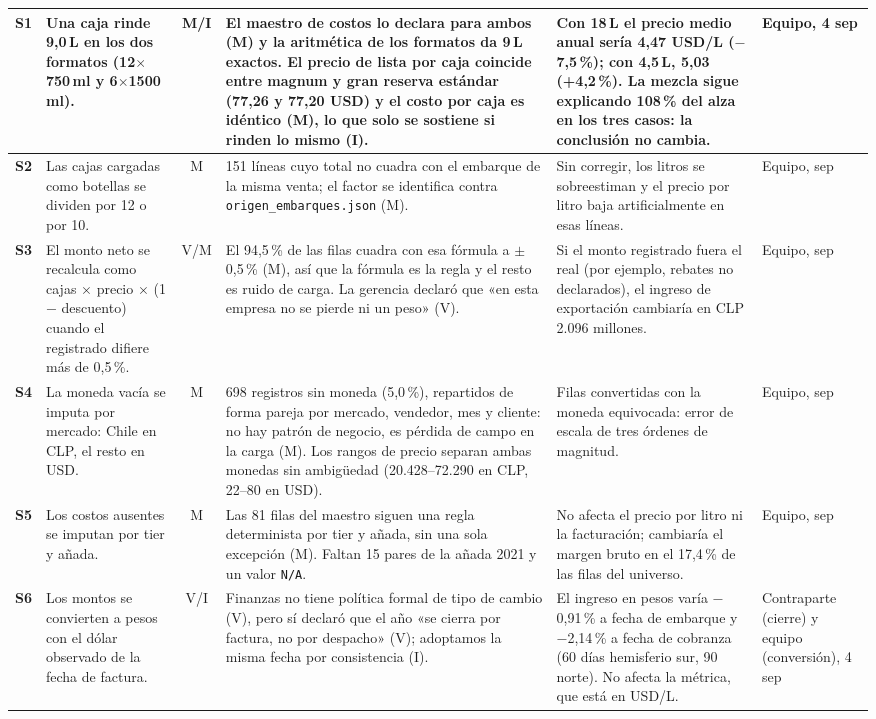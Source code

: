 \begin{longtable}{p{0.6cm} p{3.0cm} c p{4.3cm} p{4.3cm} p{2.0cm}}
\textbf{S1} & Una caja rinde 9,0\,L en los dos formatos (12$\times$750\,ml y 6$\times$1500\,ml). & M/I & El maestro de costos lo declara para ambos (M) y la aritmética de los formatos da 9\,L exactos. El precio de lista por caja coincide entre magnum y gran reserva estándar (77,26 y 77,20 USD) y el costo por caja es idéntico (M), lo que solo se sostiene si rinden lo mismo (I). & Con 18\,L el precio medio anual sería 4,47 USD/L ($-$7,5\,\%); con 4,5\,L, 5,03 (+4,2\,\%). La mezcla sigue explicando 108\,\% del alza en los tres casos: la conclusión no cambia. & Equipo, 4 sep \\
\midrule
\textbf{S2} & Las cajas cargadas como botellas se dividen por 12 o por 10. & M & 151 líneas cuyo total no cuadra con el embarque de la misma venta; el factor se identifica contra \texttt{origen\_embarques.json} (M). & Sin corregir, los litros se sobreestiman y el precio por litro baja artificialmente en esas líneas. & Equipo, sep \\
\midrule
\textbf{S3} & El monto neto se recalcula como cajas $\times$ precio $\times$ (1 $-$ descuento) cuando el registrado difiere más de 0,5\,\%. & V/M & El 94,5\,\% de las filas cuadra con esa fórmula a $\pm$0,5\,\% (M), así que la fórmula es la regla y el resto es ruido de carga. La gerencia declaró que «en esta empresa no se pierde ni un peso» (V). & Si el monto registrado fuera el real (por ejemplo, rebates no declarados), el ingreso de exportación cambiaría en CLP 2.096 millones. & Equipo, sep \\
\midrule
\textbf{S4} & La moneda vacía se imputa por mercado: Chile en CLP, el resto en USD. & M & 698 registros sin moneda (5,0\,\%), repartidos de forma pareja por mercado, vendedor, mes y cliente: no hay patrón de negocio, es pérdida de campo en la carga (M). Los rangos de precio separan ambas monedas sin ambigüedad (20.428--72.290 en CLP, 22--80 en USD). & Filas convertidas con la moneda equivocada: error de escala de tres órdenes de magnitud. & Equipo, sep \\
\midrule
\textbf{S5} & Los costos ausentes se imputan por tier y añada. & M & Las 81 filas del maestro siguen una regla determinista por tier y añada, sin una sola excepción (M). Faltan 15 pares de la añada 2021 y un valor \texttt{N/A}. & No afecta el precio por litro ni la facturación; cambiaría el margen bruto en el 17,4\,\% de las filas del universo. & Equipo, sep \\
\midrule
\textbf{S6} & Los montos se convierten a pesos con el dólar observado de la fecha de factura. & V/I & Finanzas no tiene política formal de tipo de cambio (V), pero sí declaró que el año «se cierra por factura, no por despacho» (V); adoptamos la misma fecha por consistencia (I). & El ingreso en pesos varía $-$0,91\,\% a fecha de embarque y $-$2,14\,\% a fecha de cobranza (60 días hemisferio sur, 90 norte). No afecta la métrica, que está en USD/L. & Contraparte (cierre) y equipo (conversión), 4 sep \\

\end{longtable}
